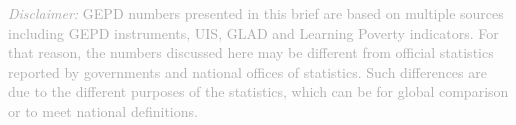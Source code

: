 \documentclass[twocolumn]{article}
\begin{document}
{\scriptsize
    \textcolor{darkgray}{\textit{Disclaimer:} GEPD numbers presented in this brief are based on multiple sources including GEPD instruments, UIS, GLAD and Learning Poverty indicators. For that reason, the numbers discussed here may be different from official statistics reported by governments and national offices of statistics. Such differences are due to the different purposes of the statistics, which can be for global comparison or to meet national definitions.}
  }
\end{document}
